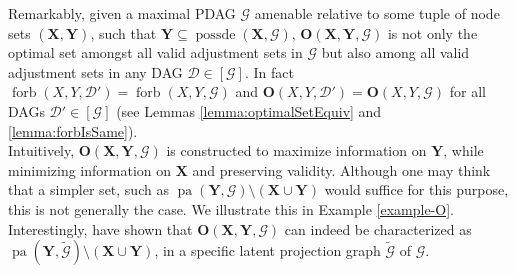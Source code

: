 \documentclass[11pt,a4paper]{article}
\theoremstyle{definition}
\theoremstyle{remark}
\DeclareMathOperator{\Forbb}{forb}
\DeclareMathOperator{\pa}{pa}
\DeclareMathOperator{\possde}{possde}
\DeclareMathOperator{\CN}{cn}
\newcommand{\mpdag}{maximal PDAG}
\newcommand{\g}[1][G]{\mathcal{#1}}
\newcommand{\f}[2][X,Y]{\Forbb(#1,#2)}
\newcommand{\cnb}[2][X,Y]{\CN(\mathbf{#1},#2)}
\newcommand{\opt}[2][X,Y]{\mathbf{O}(#1,#2)}
\newcommand{\optb}[2][X,Y]{\mathbf{O}(\mathbf{#1},#2)}
\begin{document}
Remarkably, given a \mpdag{} $\g$ amenable relative to some tuple of node sets $(\mathbf{X},\mathbf{Y})$, such that $\mathbf{Y} \subseteq \possde(\mathbf{X},\g)$, $\optb{\g}$ is not only the optimal set amongst all valid adjustment sets in $\g$ but also among all valid adjustment sets in any DAG $\g[D] \in [\g]$. In fact $\f{\g[D']}=\f{\g}$ and $\opt{\g[D']} = \opt{\g}$ for all DAGs $\g[D'] \in [\g]$ (see Lemmas \ref{lemma:optimalSetEquiv} and \ref{lemma:forbIsSame}). \\

Intuitively, $\optb{\g}$ is constructed to maximize information on $\mathbf{Y}$, while minimizing information on $\mathbf{X}$ and preserving validity. Although one may think that a simpler set, such as $\pa(\mathbf{Y},\g) \setminus (\mathbf{X} \cup \mathbf{Y})$ would suffice for this purpose, this is not generally the case.
We illustrate this in Example \ref{example-O}. Interestingly, \citet{outcomeIDA} have shown that $\optb{\g}$ can indeed be characterized as $\pa(\mathbf{Y},\tilde{\g}) \setminus (\mathbf{X} \cup \mathbf{Y})$, in a specific latent projection graph $\tilde{\g}$ of $\g$. 
\end{document}
